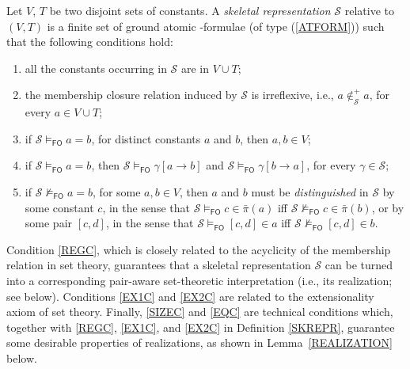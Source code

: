 \documentclass[manyauthors]{fundam}
\newcommand{\nonpairssym}{\bar{\pi}}
\newcommand{\nonpairs}[1]{\nonpairssym(#1)}
\newcommand{\memclosure}[1]{\in_{#1}^{+}}
\newcommand{\pairin}[3]{\left[#1,#2\right] \in #3}
\newcommand{\seteq}[2]{#1=#2}
\newcommand{\atset}{\mathcal{S}}
\newcommand{\consta}{a}
\newcommand{\constb}{b}
\newcommand{\constc}{c}
\newcommand{\constd}{d}
\newcommand{\subst}[3]{#1[#2\rightarrow#3]}
\newcommand{\fomodels}[2]{#1 \models_{\mathsf{FO}} #2}
\newcommand{\notfomodels}[2]{#1 \not\models_{\mathsf{FO}} #2}
\begin{document}
\begin{definition}\label{SKREPR}
Let $V$, $T$ be
two disjoint sets of constants. A \emph{skeletal
representation} $\atset$ relative to $(V,T)$ is a finite set of ground atomic
\Forallpizero-formulae (of type (\ref{ATFORM})) such that the 
following conditions hold:
\begin{enumerate}[label=\textrm{(S\arabic*)},leftmargin=.9cm]
    \item\label{SIZEC} all the constants occurring in $\atset$ are in 
$V \cup T$;
    \item\label{REGC} the membership closure relation induced by $\atset$ is
    irreflexive, i.e.,  $\consta \not \memclosure{\atset} \consta$, for every
   $\consta \in V \cup T$;

   \item\label{EQC} if $\fomodels{\atset}{\seteq{\consta}{\constb}}$, 
for distinct constants $a$ and $b$, then $a,b \in V$;

   \item\label{EX1C} if $\fomodels{\atset}{\seteq{\consta}{\constb}}$, then
   $\fomodels{\atset}{\subst{\gamma}{\consta}{\constb}}$ and 
$\fomodels{\atset}{\subst{\gamma}{\constb}{\consta}}$, for every 
$\gamma \in \atset$;

   \item\label{EX2C} if 
$\notfomodels{\atset}{\seteq{\consta}{\constb}}$, for some $\consta, 
\constb \in V$,
   then $\consta$ and $\constb$ must be \emph{distinguished}
   in $\atset$ by some constant $\constc$, in the sense that 
$\fomodels{\atset}{\constc \in \nonpairs{\consta}}$
   iff $\notfomodels{\atset}{\constc \in \nonpairs{\constb}}$,
   or by some pair $[\constc, \constd]$, in the sense that 
$\fomodels{\atset}{\pairin{\constc}{\constd}{\consta}}$
   iff $\notfomodels{\atset}{\pairin{\constc}{\constd}{\constb}}$.  %
\end{enumerate}
\end{definition}
%
Condition \ref{REGC}, which is closely related to the acyclicity of 
the membership relation in set theory, guarantees that a skeletal 
representation
$\atset$ can be turned into a corresponding pair-aware set-theoretic
interpretation (i.e., its realization; see below).
%
Conditions \ref{EX1C} and \ref{EX2C} are related to the 
extensionality axiom of set theory.
%
Finally, \ref{SIZEC} and \ref{EQC} are technical conditions which,
together with \ref{REGC}, \ref{EX1C}, and \ref{EX2C} in Definition 
\ref{SKREPR}, guarantee some desirable properties of realizations, as 
shown in Lemma~\ref{REALIZATION} below.
\end{document}
